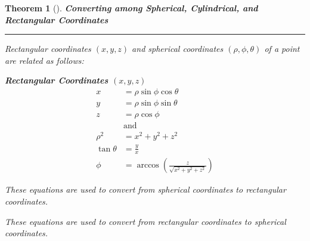 \documentclass[10pt]{book}
\theoremstyle{boldcolor}
\newtheorem{theorem}{Theorem}[section]
\newenvironment{mytheorem}[2][]
  {\begin{mdframed}[style=theoremstyle]\begin{theorem}[{#1}]\textbf{ \color{cactusgreen}#2}\nobreak\textcolor{cactusgreen}{\hrule height 0.5pt}\nobreak\vspace{0.5em}\color{black}}
  {\end{theorem}\end{mdframed}}
\begin{document}


\begin{mytheorem}{Converting among Spherical, Cylindrical, and Rectangular Coordinates} %
    Rectangular coordinates $(x, y, z)$ and spherical coordinates $(\rho, \phi, \theta)$ of a point are related as follows:
    \begin{multicols}{3} %

        \centering %
        \noindent \textbf{Rectangular Coordinates $(x,y,z)$} %
        \noindent
        \begin{align*}
            x          & = \rho \sin\phi \cos\theta                             \\
            y          & = \rho \sin\phi \sin\theta                             \\
            z          & = \rho \cos\phi                                        \\
                       & \text{and}                                             \\
            \rho^2     & = x^2 + y^2 + z^2                                      \\
            \tan\theta & = \frac{y}{x}                                          \\
            \phi       & = \arccos\left(\frac{z}{\sqrt{x^2 + y^2 + z^2}}\right)
        \end{align*}
        \columnbreak %

        \vspace*{\fill} %
        \noindent These equations are used to convert from spherical coordinates to rectangular coordinates.

        \vspace{0.5cm} %

        \noindent These equations are used to convert from rectangular coordinates to spherical coordinates.
        \vspace*{\fill} %


\end{multicols}
\end{mytheorem}
\end{document}
